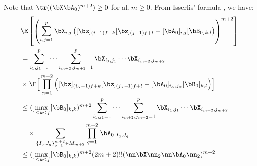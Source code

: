 \begin{IEEEproof}
Note that $\tr((\bX\bA_0)^{m+2})\geq 0$ for all $m\geq 0$. From Isserlis' formula \cite{Isserlis}, we have:
\begin{align*}
	& \E\left[ \left( \sum_{i,j=1}^p \bX_{i,j} \left([\bz]_{(i-1)f+k}[\bz]_{(j-1)f+l}-[\bA_0]_{i,j}[\bB_0]_{k,l}  \right) \right)^{m+2} \right] \\
	&= \sum_{i_1,j_1=1}^p \cdots \sum_{i_{m+2},j_{m+2}=1}^p \bX_{i_1,j_1} \cdots \bX_{i_{m+2},j_{m+2}} \\
			&\times  \E\Big[ \prod_{\alpha=1}^{m+2} \Big( [\bz]_{(i_\alpha-1)f+k}[\bz]_{(j_\alpha-1)f+l} -[\bA_0]_{i_\alpha,j_\alpha}[\bB_0]_{k,l} \Big) \Big] \\
			&\leq (\max_{1\leq k\leq f} [\bB_0]_{k,k})^{m+2} \sum_{i_1,j_1=1}^p \cdots \sum_{i_{m+2},j_{m+2}=1}^p \bX_{i_1,j_1} \cdots \bX_{i_{m+2},j_{m+2}}  \\
			&\quad \times \sum_{\{I_q,J_q\}_{q=1}^{m+2} \in M_{m+2}} \prod_{q=1}^{m+2} [\bA_0]_{I_q,J_q} \\
			&\leq (\max_{1\leq k\leq f} [\bB_0]_{k,k})^{m+2} (2m+2)!! (\nn\bX\nn_2 \nn\bA_0\nn_2)^{m+2}
\end{align*}


\end{IEEEproof}
